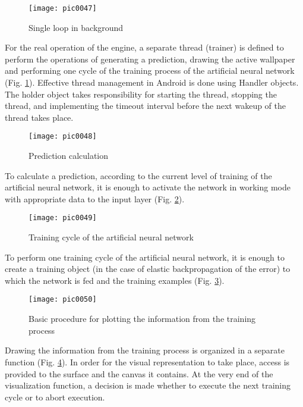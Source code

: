 \begin{figure}[h]
\centering
\texttt{[image: pic0047]}
\caption{Single loop in background}
\label{fig:pic0047}
\end{figure}
\FloatBarrier

For the real operation of the engine, a separate thread (trainer) is defined to perform the operations of generating a prediction, drawing the active wallpaper and performing one cycle of the training process of the artificial neural network (Fig. \ref {fig:pic0047}). Effective thread management in Android is done using Handler objects. The holder object takes responsibility for starting the thread, stopping the thread, and implementing the timeout interval before the next wakeup of the thread takes place.

\begin{figure}[h]
\centering
\texttt{[image: pic0048]}
\caption{Prediction calculation}
\label{fig:pic0048}
\end{figure}
\FloatBarrier

To calculate a prediction, according to the current level of training of the artificial neural network, it is enough to activate the network in working mode with appropriate data to the input layer (Fig. \ref{fig:pic0048}).

\begin{figure}[h]
\centering
\texttt{[image: pic0049]}
\caption{Training cycle of the artificial neural network}
\label{fig:pic0049}
\end{figure}
\FloatBarrier

To perform one training cycle of the artificial neural network, it is enough to create a training object (in the case of elastic backpropagation of the error) to which the network is fed and the training examples (Fig. \ref{fig:pic0049}).

\begin{figure}[h]
\centering
\texttt{[image: pic0050]}
\caption{Basic procedure for plotting the information from the training process}
\label{fig:pic0050}
\end{figure}
\FloatBarrier

Drawing the information from the training process is organized in a separate function (Fig. \ref{fig:pic0050}). In order for the visual representation to take place, access is provided to the surface and the canvas it contains. At the very end of the visualization function, a decision is made whether to execute the next training cycle or to abort execution.

